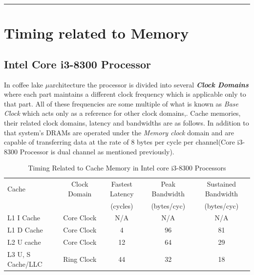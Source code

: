 \documentclass[a4paper,11pt]{article}
\begin{document}
\vspace{1cm}\hrule
\section{Timing related to Memory}

\subsection{Intel Core i3-8300 Processor}
In coffee lake $\mu$architecture the processor is divided into several \textbf{\textit{Clock Domains}} where each part maintains a different clock frequency which is applicable only to that part. All of these frequencies are some multiple of what is known as \textit{Base Clock} which acts only as a reference for other clock domains\cite{Kaby},\cite{Skylake}. Cache memories, their related clock domains, latency and bandwidths are as follows. In addition to that system's DRAMs are operated under the \textit{Memory clock} domain and are capable of transferring data at the rate of 8 bytes per cycle per channel\cite{Coffee}(Core i3-8300 Processor is dual channel as mentioned previously).

 \begin{table}[!h]
	\centering
	\begin{tabular}{l| c|c|c|c }
		Cache &Clock Domain&Fastest Latency&Peak Bandwidth&Sustained Bandwidth\\
		&&(cycles)&(bytes/cyc)&(bytes/cyc)\\\hline
		L1 I Cache&Core Clock &N/A&N/A&N/A\\
		L1 D Cache&Core Clock &4&96&81\\
		L2 U cache&Core Clock &12&64&29\\
		L3 U, S Cache/LLC&Ring Clock&44&32&18\\
		\hline\hline
	\end{tabular}
	\caption{Timing Related to Cache Memory in Intel core i3-8300 Processors\cite{iaorm}}
\end{table}
\end{document}
